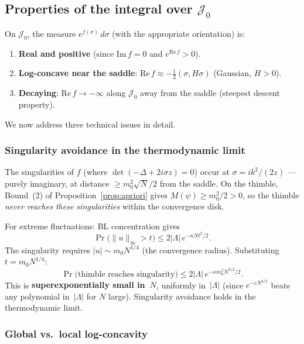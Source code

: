 \documentclass[12pt]{article}
\theoremstyle{definition}
\theoremstyle{remark}
\newcommand{\La}{\Lambda}
\newcommand{\im}{\mathrm{Im}}
\newcommand{\re}{\mathrm{Re}}
\begin{document}
\subsection{Properties of the integral over $\mathcal{J}_0$}

On $\mathcal{J}_0$, the measure $e^{f(\sigma)}\,d\sigma$ (with the
appropriate orientation) is:
\begin{enumerate}
\item \textbf{Real and positive} (since $\im\,f = 0$
  and $e^{\re\,f} > 0$).
\item \textbf{Log-concave near the saddle}: $\re\,f
  \approx -\tfrac{1}{2}(\sigma,H\sigma)$ (Gaussian, $H > 0$).
\item \textbf{Decaying}: $\re\,f \to -\infty$ along
  $\mathcal{J}_0$ away from the saddle (steepest descent property).
\end{enumerate}

We now address three technical issues in detail.

\subsubsection{Singularity avoidance in the thermodynamic limit}

The singularities of $f$ (where $\det(-\Delta+2i\sigma z) = 0$)
occur at $\sigma = ik^2/(2z)$ --- purely imaginary, at distance
$\ge m_0^2\sqrt{N}/2$ from the saddle. On the thimble,
Bound~(2) of Proposition~\ref{prop:apriori} gives
$M(\psi) \ge m_0^2/2 > 0$, so the thimble \emph{never reaches
these singularities} within the convergence disk.

For extreme fluctuations: BL concentration gives
\begin{equation}
  \Pr\bigl(\|u\|_\infty > t\bigr)
    \le 2|\La|\,e^{-\kappa N t^2/2}.
\end{equation}
The singularity requires $|u| \sim m_0 N^{1/4}$ (the convergence
radius). Substituting $t = m_0 N^{1/4}$:
\begin{equation}
  \Pr\bigl(\text{thimble reaches singularity}\bigr)
    \le 2|\La|\,e^{-\kappa m_0^2 N^{3/2}/2}.
\end{equation}
This is \textbf{superexponentially small in~$N$}, uniformly
in~$|\La|$ (since $e^{-cN^{3/2}}$ beats any polynomial in~$|\La|$
for $N$ large). Singularity avoidance holds in the thermodynamic
limit.

\subsubsection{Global vs.\ local log-concavity}
\label{sec:global_logconcave}
\end{document}
